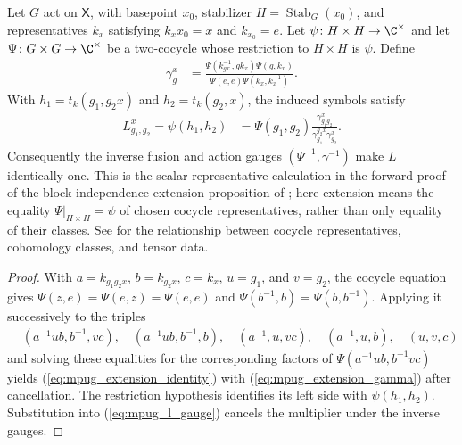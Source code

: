\begin{lemma}
    \label{thm:mpug_stabilizer_extension_gauge}
    \leanok
    Let $G$ act on $\mathsf X$, with basepoint $x_0$, stabilizer
    $H=\operatorname{Stab}_G(x_0)$, and representatives $k_x$ satisfying
    $k_xx_0=x$ and $k_{x_0}=e$.
    Let $\psi\colon H\times H\to\C^\times$ and let
    $\Psi\colon G\times G\to\C^\times$ be a two-cocycle whose restriction
    to $H\times H$ is $\psi$. Define
    \begin{align}
        \gamma_g^x
         & =\frac{\Psi(k_{gx}^{-1},gk_x)\Psi(g,k_x)}
        {\Psi(e,e)\Psi(k_x,k_x^{-1})}.
        \label{eq:mpug_extension_gamma}
    \end{align}
    With $h_1=t_k(g_1,g_2x)$ and $h_2=t_k(g_2,x)$, the induced symbols satisfy
    \begin{align}
        L^x_{g_1,g_2}=\psi(h_1,h_2)
         & =\Psi(g_1,g_2)\frac{\gamma_{g_1g_2}^x}
        {\gamma_{g_1}^{g_2x}\gamma_{g_2}^x}.
        \label{eq:mpug_extension_identity}
    \end{align}
    Consequently the inverse fusion and action gauges
    $(\Psi^{-1},\gamma^{-1})$ make $L$ identically one.
    This is the scalar representative calculation in the forward proof of
    the block-independence extension proposition of
    \cite{FrancoRubio2025MPUGauging};
    here extension means the equality $\Psi|_{H\times H}=\psi$ of chosen
    cocycle representatives, rather than only equality of their classes.
    See \cite{gap:fbc25_mpu_action_stabilizer_source_audit} for the
    relationship between cocycle representatives, cohomology classes, and
    tensor data.
\end{lemma}

\begin{proof}\leanok
    With $a=k_{g_1g_2x}$, $b=k_{g_2x}$, $c=k_x$, $u=g_1$, and $v=g_2$,
    the cocycle equation gives $\Psi(z,e)=\Psi(e,z)=\Psi(e,e)$ and
    $\Psi(b^{-1},b)=\Psi(b,b^{-1})$. Applying it successively to the triples
    \begin{align}
         & (a^{-1}ub,b^{-1},vc),\quad (a^{-1}ub,b^{-1},b),\quad
        (a^{-1},u,vc),\quad (a^{-1},u,b),\quad (u,v,c)
    \end{align}
    and solving these equalities for the corresponding factors of
    $\Psi(a^{-1}ub,b^{-1}vc)$ yields
    (\ref{eq:mpug_extension_identity}) with
    (\ref{eq:mpug_extension_gamma}) after cancellation. The restriction
    hypothesis identifies its left side with $\psi(h_1,h_2)$. Substitution into
    (\ref{eq:mpug_l_gauge}) cancels the multiplier under the inverse gauges.
\end{proof}

